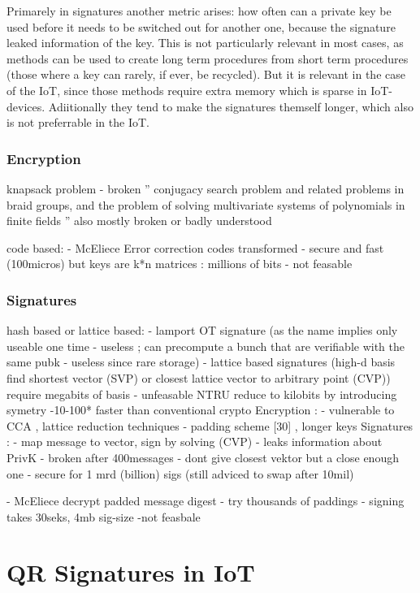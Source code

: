 \documentclass[conference]{IEEEtran}
\begin{document}
Primarely in signatures another metric arises: how often can a private key be used before it needs to be switched out for another one, because the signature leaked information of the key.
This is not particularly relevant in most cases, as methods can be used to create long term procedures from short term procedures (those where a key can rarely, if ever, be recycled).
But it is relevant in the case of the IoT, since those methods require extra memory which is sparse in IoT-devices. Adiitionally they tend to make the signatures themself longer, which also is not preferrable in the IoT. \cite{QR_algs}

\subsubsection{Encryption}
knapsack problem - broken
''
conjugacy search problem and related problems in braid groups, and the problem of solving
multivariate systems of polynomials in finite fields
'' also mostly broken or badly understood \cite{QR_algs}

code based:
- McEliece Error correction codes transformed - secure and fast (100micros) but keys are k*n matrices : millions of bits \cite{QR_algs} - not feasable 

\subsubsection{Signatures} 
hash based or lattice based:
- lamport OT signature \cite{QR_algs} (as the name implies only useable one time - useless ; can precompute a bunch that are verifiable with the same pubk - useless since rare storage)
- lattice based signatures (high-d basis find shortest vector (SVP) or closest lattice vector to arbitrary point (CVP)) require megabits of basis - unfeasable NTRU reduce to kilobits by introducing symetry \cite{QR_algs}
    -10-100* faster than conventional crypto
    Encryption : - vulnerable to CCA , lattice reduction techniques - padding scheme [30] , longer keys \cite{QR_algs}
    Signatures : - map message to vector, sign by solving (CVP) - leaks information about PrivK - broken after 400messages - dont give closest vektor but a close enough one - secure for 1 mrd (billion) sigs (still adviced to swap after 10mil)

- McEliece decrypt padded message digest - try thousands of paddings - signing takes 30seks, 4mb sig-size -not feasbale
\section{QR Signatures in IoT}
\end{document}
